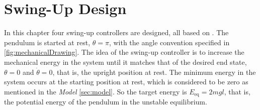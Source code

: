 \chapter{Swing-Up Design}\label{sec:swing-upDesign}
In this chapter four swing-up controllers are designed, all based on \cite{kjAastrom}. The pendulum is started at rest, $\theta = \pi$, with the angle convention specified in \autoref{fig:mechanicalDrawing}. The idea of the swing-up controller is to increase the mechanical energy in the system until it matches that of the desired end state, $\theta = 0$ and $\dot{\theta} = 0$, that is, the upright position at rest. The minimum energy in the system occurs at the starting position at rest, which is considered to be zero as mentioned in the \textit{Model} \autoref{sec:model}. So the target energy is $E_{\mathrm{eq}} = 2 m g l$, that is, the potential energy of the pendulum in the unstable equilibrium.

